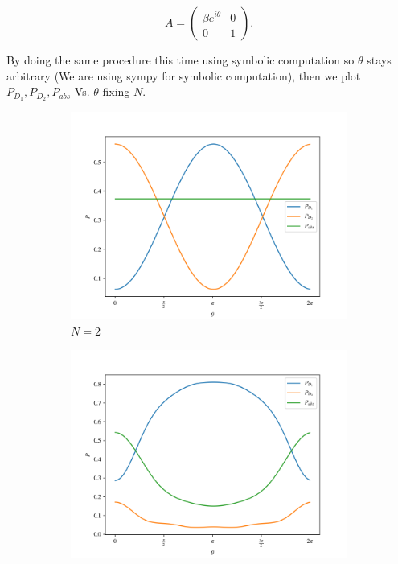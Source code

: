 \documentclass{book}
\begin{document}
\begin{equation}
 A=\begin{pmatrix} \beta e^{i \theta}& 0\\0&  1\end{pmatrix}.
 \end{equation}

By doing the same procedure this time using symbolic computation so $\theta$ stays arbitrary (We are using sympy for symbolic computation), then we plot $P_{D_{1}},P_{D_{2}},P_{abs}$ Vs. $\theta$ fixing $N$.

\begin{figure}[H]
\centering
\begin{subfigure}[b]{0.30\linewidth}
\includegraphics[width=\linewidth]{images/Azuma_phases2.png}
\caption{$N=2$}
\end{subfigure}
\begin{subfigure}[b]{0.30\linewidth}
\includegraphics[width=\linewidth]{images/Azuma_phases5.png}

\end{subfigure}
\end{figure}
\end{document}

